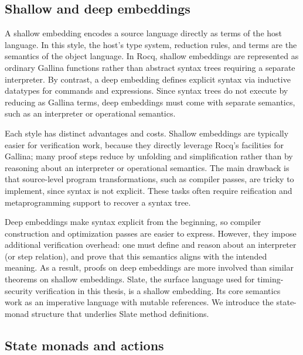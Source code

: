 \documentclass[fontset=fira-newtxsf]{mitthesis}
\theoremstyle{definition}
\theoremstyle{plain}
\begin{document}
\subsection{Shallow and deep embeddings} \label{sec:timing-monads-shallow}
A shallow embedding encodes a source language directly as terms of the host language.
In this style, the host's type system, reduction rules, and terms are the semantics of the object language.
In Rocq, shallow embeddings are represented as ordinary Gallina functions rather than abstract syntax trees requiring a separate interpreter.
By contrast, a deep embedding defines explicit syntax via inductive datatypes for commands and expressions.
Since syntax trees do not execute by reducing as Gallina terms, deep embeddings must come with separate semantics, such as an interpreter or operational semantics.

Each style has distinct advantages and costs.
Shallow embeddings are typically easier for verification work, because they directly leverage Rocq's facilities for Gallina; many proof steps reduce by unfolding and simplification rather than by reasoning about an interpreter or operational semantics.
The main drawback is that source-level program transformations, such as compiler passes, are tricky to implement, since syntax is not explicit.
These tasks often require reification and metaprogramming support to recover a syntax tree.

Deep embeddings make syntax explicit from the beginning, so compiler construction and optimization passes are easier to express.
However, they impose additional verification overhead: one must define and reason about an interpreter (or step relation), and prove that this semantics aligns with the intended meaning.
As a result, proofs on deep embeddings are more involved than similar theorems on shallow embeddings.
Slate, the surface language used for timing-security verification in this thesis, is a shallow embedding.
Its core semantics work as an imperative language with mutable references.
We introduce the state-monad structure that underlies Slate method definitions.

\subsection{State monads and actions} \label{sec:timing-monads-state}
\end{document}
